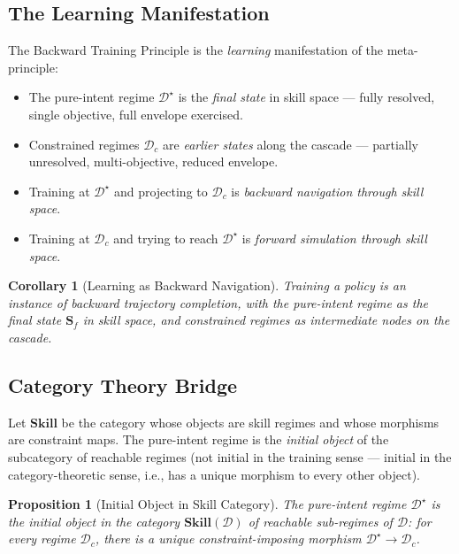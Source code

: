 \documentclass[11pt,twocolumn,a4paper]{article}
\newtheorem{corollary}[theorem]{Corollary}
\newtheorem{proposition}[theorem]{Proposition}
\newcommand{\cD}{\mathcal{D}}
\begin{document}
\subsection{The Learning Manifestation}

The Backward Training Principle is the \emph{learning} manifestation of the meta-principle:

\begin{itemize}[leftmargin=*,itemsep=1pt]
\item The pure-intent regime $\cD^\star$ is the \emph{final state} in skill space --- fully resolved, single objective, full envelope exercised.
\item Constrained regimes $\cD_c$ are \emph{earlier states} along the cascade --- partially unresolved, multi-objective, reduced envelope.
\item Training at $\cD^\star$ and projecting to $\cD_c$ is \emph{backward navigation through skill space}.
\item Training at $\cD_c$ and trying to reach $\cD^\star$ is \emph{forward simulation through skill space}.
\end{itemize}

\begin{corollary}[Learning as Backward Navigation]
\label{cor:learning-as-nav}
Training a policy is an instance of backward trajectory completion, with the pure-intent regime as the final state $\mathbf{S}_f$ in skill space, and constrained regimes as intermediate nodes on the cascade.
\end{corollary}

\subsection{Category Theory Bridge}

Let $\mathbf{Skill}$ be the category whose objects are skill regimes and whose morphisms are constraint maps. The pure-intent regime is the \emph{initial object} of the subcategory of reachable regimes (not initial in the training sense --- initial in the category-theoretic sense, i.e., has a unique morphism to every other object).

\begin{proposition}[Initial Object in Skill Category]
\label{prop:initial-object}
The pure-intent regime $\cD^\star$ is the initial object in the category $\mathbf{Skill}(\cD)$ of reachable sub-regimes of $\cD$: for every regime $\cD_c$, there is a unique constraint-imposing morphism $\cD^\star \to \cD_c$.
\end{proposition}
\end{document}
